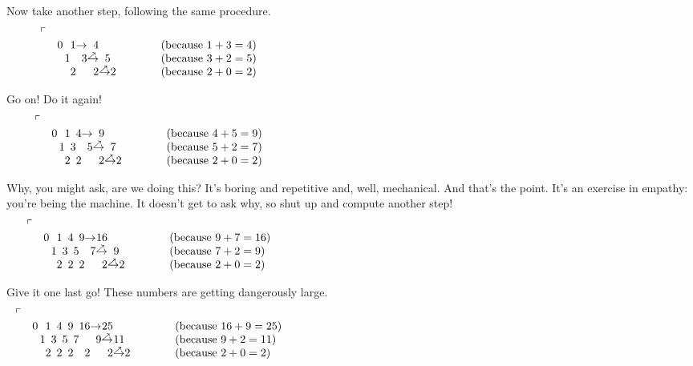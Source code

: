 \documentclass{book}
\begin{document}
Now take another step, following the same procedure.
\[\begin{array}{lr@{}r@{}r@{}r@{}r@{}r@{}r@{\qquad\qquad}l}
\ulcorner&\\
& 0\, &   & 1 & \rightarrow  & 4     &       &   & \mbox{(because $1+3=4$)}\\
&     & 1 &   & 3            & \upri & 5     &   & \mbox{(because $3+2=5$)}\\
&     &   & 2 &              & 2     & \upri & 2 & \mbox{(because $2+0=2$)}
\end{array}
\hspace*{5in}\]

Go on! Do it again!
\[\begin{array}{lr@{}r@{}r@{}r@{}r@{}r@{}r@{}r@{}r@{\qquad\qquad}l}
\ulcorner&\\
& 0\, &   & 1 &   & 4 & \rightarrow  & 9     &       &   & \mbox{(because $4+5=9$)}\\
&     & 1 &   & 3 &   & 5            & \upri & 7     &   & \mbox{(because $5+2=7$)}\\
&     &   & 2 &   & 2 &              & 2     & \upri & 2 & \mbox{(because $2+0=2$)}
\end{array}
\hspace*{5in}\]

Why, you might ask, are we doing this? It's boring and repetitive and, well, mechanical.
And that's the point. It's an exercise in empathy: you're being the machine. It doesn't get to ask why, so shut up and compute another step!
\[\begin{array}{lr@{}r@{}r@{}r@{}r@{}r@{}r@{}r@{}r@{}r@{}r@{\qquad\qquad}l}
\ulcorner&\\
& 0\, &   & 1 &   & 4 &   & 9 & \rightarrow & 16    &       &   & \mbox{(because $9+7=16$)}\\
&     & 1 &   & 3 &   & 5 &   & 7           & \upri & 9     &   & \mbox{(because $7+2=9$)}\\
&     &   & 2 &   & 2 &   & 2 &             & 2     & \upri & 2 & \mbox{(because $2+0=2$)}
\end{array}
\hspace*{5in}\]

Give it one last go! These numbers are getting dangerously large.
\[\begin{array}{lr@{}r@{}r@{}r@{}r@{}r@{}r@{}r@{}r@{}r@{}r@{}r@{}r@{\qquad\qquad}l}
\ulcorner&\\
& 0\, &   & 1 &   & 4 &   & 9 &   & 16 & \rightarrow & 25    &       &   & \mbox{(because $16+9=25$)}\\
&     & 1 &   & 3 &   & 5 &   & 7 &    & 9           & \upri & 11    &   & \mbox{(because $9+2=11$)}\\
&     &   & 2 &   & 2 &   & 2 &   &  2 &             & 2     & \upri & 2 & \mbox{(because $2+0=2$)}
\end{array}
\hspace*{5in}\]
\end{document}
